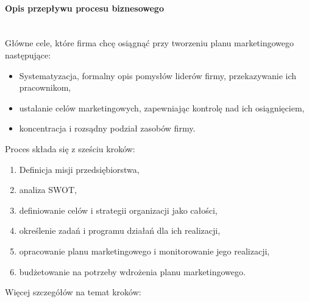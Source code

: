 \documentclass[a4paper, 12pt]{article}
\begin{document}
\paragraph{Opis przepływu procesu biznesowego}\mbox{}\\
\hspace*{1 cm} Główne cele, które firma chcę osiągnąć przy tworzeniu planu marketingowego następujące:
\begin{itemize}
	\item Systematyzacja, formalny opis pomysłów liderów firmy, przekazywanie ich pracownikom,
	\item ustalanie celów marketingowych, zapewniając kontrolę nad ich osiągnięciem,
	\item koncentracja i rozsądny podział zasobów firmy.
\end{itemize} 
\hspace*{1 cm} Proces składa się z sześciu kroków:
\begin{enumerate}
	\item Definicja misji przedsiębiorstwa,
	\item analiza SWOT,
	\item definiowanie celów i strategii organizacji jako całości,
	\item określenie zadań i programu działań dla ich realizacji,
	\item opracowanie planu marketingowego i monitorowanie jego realizacji,
	\item budżetowanie na potrzeby wdrożenia planu marketingowego.
\end{enumerate}
Więcej szczegółów na temat kroków:
\end{document}
